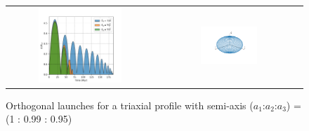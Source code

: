 \documentclass{beamer}
\begin{document}
\begin{frame}
	\begin{figure}[h]
		\begin{tabular}{cc}
			\includegraphics[width = 0.6\textwidth]{"../Files/Week 7/orthogonal_triaxial"} &
			\includegraphics[width = 0.4\textwidth]{"../Files/Week 7/ellipsoid"}
		\end{tabular}
		\caption{Orthogonal launches for a triaxial profile with semi-axis ($a_1$:$a_2$:$a_3$) = (1 : 0.99 : 0.95)}
		\label{fig: mainOrthogonalLaunches}
	\end{figure}
\end{frame}
\end{document}
